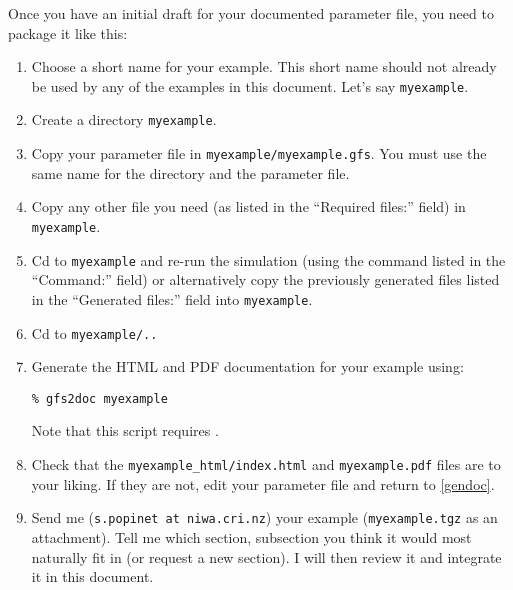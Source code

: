 \documentclass[a4paper]{article}
\begin{document}
Once you have an initial draft for your documented parameter file, you need to package it like this:
\begin{enumerate}
\item Choose a short name for your example. This short name should not already be used by any of the examples in this document. Let's say {\tt myexample}.
\item Create a directory {\tt myexample}.
\item Copy your parameter file in {\tt myexample/myexample.gfs}. You must use the same name for the directory and the parameter file.
\item Copy any other file you need (as listed in the ``Required files:'' field) in {\tt myexample}.
\item Cd to {\tt myexample} and re-run the simulation (using the command listed in the ``Command:'' field) or alternatively copy the previously generated files listed in the ``Generated files:'' field into {\tt myexample}.
\item Cd to {\tt myexample/..}
\item\label{gendoc} Generate the HTML and PDF documentation for your example using:
\begin{verbatim}
% gfs2doc myexample
\end{verbatim}
Note that this script requires .
\item Check that the {\tt myexample\_html/index.html} and {\tt myexample.pdf} files are to your liking. If they are not, edit your parameter file and return to \ref{gendoc}.
\item Send me ({\tt s.popinet at niwa.cri.nz}) your example ({\tt myexample.tgz} as an attachment). Tell me which section, subsection you think it would most naturally fit in (or request a new section). I will then review it and integrate it in this document.
\end{enumerate}
\end{document}
